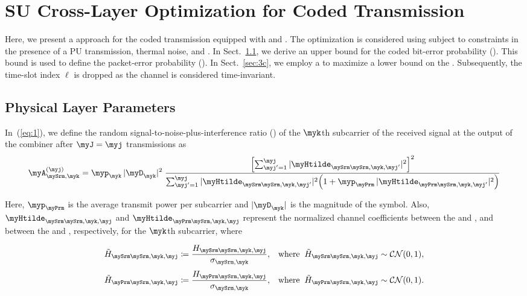 \section{\hspace{-0.5em}SU Cross-Layer Optimization for Coded Transmission}
\label{sec:3}

Here, we present a \myCLO{} approach for the \mySU{} \myLDPC{} coded transmission equipped with \myJBPL{} and \myCA{}. The optimization is considered using \myCC{} subject to \myQoS{} constraints in the presence of a PU transmission, thermal noise, and \myTPI{}. In Sect.~\ref{sec:3A}, we derive an upper bound for the coded \mySU{} bit-error probability (\myBEP{}). This bound is used to define the \mySU{} packet-error probability (\myPEP{}). In Sect.~\ref{sec:3c}, we employ a \myTHARQ{} to maximize a lower bound on the \mySU{} \mySE{}. Subsequently, the time-slot index $\ell$ is dropped as the channel is considered time-invariant.

\subsection{Physical Layer Parameters}
\label{sec:3A}

In~(\ref{eq:1}), we define the random signal-to-noise-plus-interference ratio (\mySINR{}) of the $\myk$th subcarrier of the \mySU{} received signal at the output of the combiner after $\myJ=\myj$ transmissions as
\begin{equation}
\label{eq:2}
\myA^{(\myj)}_{\mySrm,\myk} =
\myp_\myk \, |\myD_\myk|^2 \;
\frac{
    \Bigl[ \sum_{{\myj}'=1}^{\myj} |\myHtilde_{\mySrm\mySrm,\myk,{\myj}'}|^2 \Bigr]^2
}{
    \sum_{{\myj}'=1}^{\myj} |\myHtilde_{\mySrm\mySrm,\myk,{\myj}'}|^2 
    \Bigl( 1 + \myp_{\myPrm} \, |\myHtilde_{\myPrm\mySrm,\myk,{\myj}'}|^2 \Bigr)
}
\end{equation}

Here, $\myp_{\myPrm}$ is the average \myPU{} transmit power per subcarrier and $|\myD_\myk|$ is the magnitude of the \myQAM{} symbol. Also, $\myHtilde_{\mySrm\mySrm,\myk,\myj}$ and $\myHtilde_{\myPrm\mySrm,\myk,\myj}$ represent the normalized \myTF{} channel coefficients between the \mySU{} \myTX{} and \mySU{} \myRX{}, and between the \myPU{} \myTX{} and \mySU{} \myRX{}, respectively, for the $\myk$th subcarrier, where

\begin{align}
\tilde{H}_{\mySrm\mySrm,\myk,\myj} &\coloneqq \frac{H_{\mySrm\mySrm,\myk,\myj}}{\sigma_{\mySrm,\myk}}, 
& \text{where} \;\; \tilde{H}_{\mySrm\mySrm,\myk,\myj} \sim \mathcal{CN}(0,1), \\[0.3em]
\tilde{H}_{\myPrm\mySrm,\myk,\myj} &\coloneqq \frac{H_{\myPrm\mySrm,\myk,\myj}}{\sigma_{\mySrm,\myk}}, 
& \text{where} \;\; \tilde{H}_{\myPrm\mySrm,\myk,\myj} \sim \mathcal{CN}(0,1).
\end{align}

